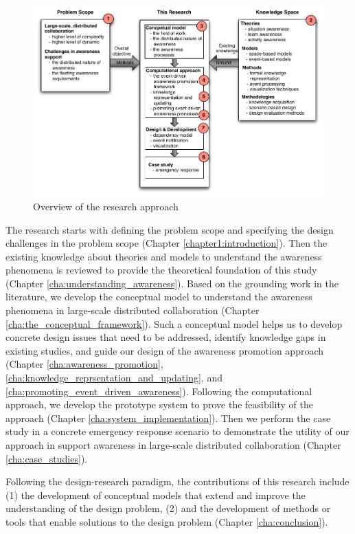 \begin{figure}[htbp] %
   \centering
   \includegraphics[width=5.8in]{research_overview.pdf} 
   \caption{Overview of the research approach}
   \label{fig:research_overview}
\end{figure}

The research starts with defining the problem scope and specifying the design challenges in the problem scope (Chapter \ref{chapter1:introduction}). Then the existing knowledge about theories and models to understand the awareness phenomena is reviewed to provide the theoretical foundation of this study (Chapter \ref{cha:understanding_awareness}). Based on the grounding work in the literature, we develop the conceptual model to understand the awareness phenomena in large-scale distributed collaboration (Chapter \ref{cha:the_conceptual_framework}). Such a conceptual model helps us to develop concrete design issues that need to be addressed, identify knowledge gaps in existing studies, and guide our design of the awareness promotion approach (Chapter \ref{cha:awareness_promotion}, \ref{cha:knowledge_reprsentation_and_updating}, and \ref{cha:promoting_event_driven_awareness}). Following the computational approach, we develop the prototype system to prove the feasibility of the approach (Chapter \ref{cha:system_implementation}). Then we perform the case study in a concrete emergency response scenario to demonstrate the utility of our approach in support awareness in large-scale distributed collaboration (Chapter \ref{cha:case_studies}). 

Following the design-research paradigm, the contributions of this research include (1) the development of conceptual models that extend and improve the understanding of the design problem, (2) and the development of methods or tools that enable solutions to the design problem (Chapter \ref{cha:conclusion}).

